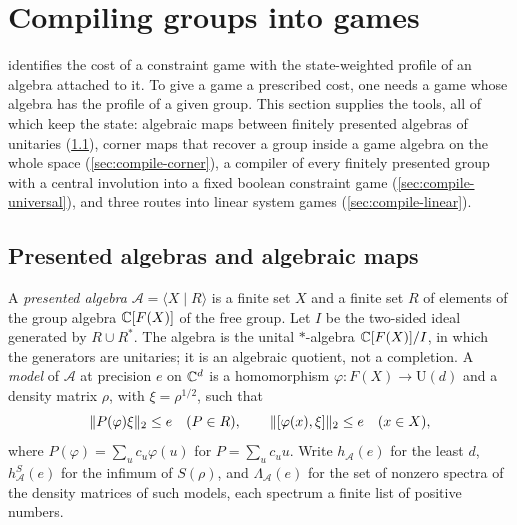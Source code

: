\section{Compiling groups into games}\label{sec:compile}

 identifies the cost of a constraint game with the state-weighted profile of an algebra attached to
it. To give a game a prescribed cost, one needs a game whose algebra has the profile of a given group. This section
supplies the tools, all of which keep the state: algebraic maps between finitely presented algebras of unitaries
(\cref{sec:compile-algebra}), corner maps that recover a group inside a game algebra on the whole space
(\cref{sec:compile-corner}), a compiler of every finitely presented group with a central involution into a fixed boolean
constraint game (\cref{sec:compile-universal}), and three routes into linear system games (\cref{sec:compile-linear}).

\subsection{Presented algebras and algebraic maps}\label{sec:compile-algebra}

A \emph{presented algebra} $\mathcal A=\langle X\mid R\rangle$ is a finite set $X$ and a finite set $R$ of elements of the
group algebra $\mathbb C[F(X)]$ of the free group. Let $I$ be the two-sided ideal generated by $R\cup R^*$. The algebra is the
unital $*$-algebra $\mathbb C[F(X)]/I$, in which the generators are unitaries; it is an algebraic quotient, not a completion. A
\emph{model} of $\mathcal A$ at precision $e$ on $\mathbb C^d$ is a homomorphism $\varphi:F(X)\to\mathrm U(d)$ and a density
matrix $\rho$, with $\xi=\rho^{1/2}$, such that
\begin{equation}\label{eq:model}
\lVert P(\varphi)\xi\rVert_2\le e\quad(P\in R),\qquad\lVert [\varphi(x),\xi]\rVert_2\le e\quad(x\in X),
\end{equation}
where $P(\varphi)=\sum_uc_u\varphi(u)$ for $P=\sum_uc_uu$. Write $h_{\mathcal A}(e)$ for the least $d$, $h^S_{\mathcal A}(e)$
for the infimum of $S(\rho)$, and $\Lambda_{\mathcal A}(e)$ for the set of nonzero spectra of the density matrices of such
models, each spectrum a finite list of positive numbers.

